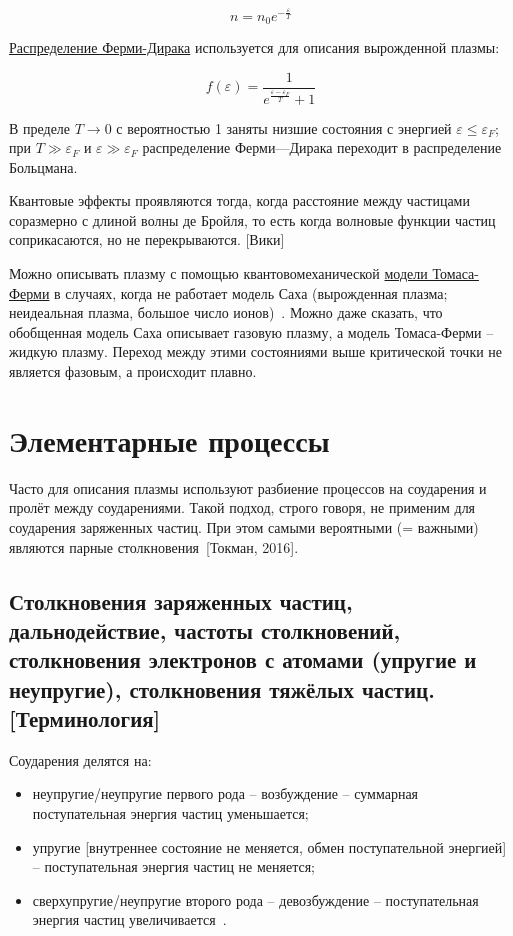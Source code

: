 \documentclass[10pt, a4paper]{article}
\newcommand{\Tokman}{~[Токман, 2016]}
\let\stdsection\section
\renewcommand\section{\newpage\stdsection}
\begin{document}
\begin{equation}
	n = n_0e^{-\frac{\varepsilon}{T}}
\end{equation}

\uline{Распределение Ферми-Дирака} используется для описания вырожденной плазмы:

\begin{equation}
	f(\varepsilon) = \frac{1}{e^{\frac{\varepsilon-\varepsilon_F}{T}}+1}
\end{equation}

В пределе $T\rightarrow 0$ с вероятностью 1 заняты низшие состояния с энергией $\varepsilon \leq \varepsilon_F$; при $T \gg \varepsilon_F$ и $\varepsilon \gg \varepsilon_F$ распределение Ферми—Дирака переходит в распределение Больцмана.

Квантовые эффекты проявляются тогда, когда расстояние между частицами соразмерно с длиной волны де Бройля, то есть когда волновые функции частиц соприкасаются, но не перекрываются. [Вики]

Можно описывать плазму с помощью квантовомеханической \uline{модели Томаса-Ферми} в случаях, когда не работает модель Саха (вырожденная плазма; неидеальная плазма, большое число ионов)~\cite{kalitkin}. Можно даже сказать, что обобщенная модель Саха описывает газовую плазму, а модель Томаса-Ферми -- жидкую плазму. Переход между этими состояниями выше критической точки не является фазовым, а происходит плавно. 

\section{Элементарные процессы}

Часто для описания плазмы используют разбиение процессов на соударения и пролёт между соударениями. Такой подход, строго говоря, не применим для соударения заряженных частиц. При этом самыми вероятными (= важными) являются парные столкновения\Tokman. 

\subsection{Столкновения заряженных частиц, дальнодействие, частоты столкновений, столкновения электронов с атомами (упругие и неупругие), столкновения тяжёлых частиц. [Терминология]}

Соударения делятся на:
\begin{itemize}
	\item неупругие/неупругие первого рода -- возбуждение -- суммарная поступательная энергия частиц уменьшается;
	\item упругие [внутреннее состояние не меняется, обмен поступательной энергией] -- поступательная энергия частиц не меняется;
	\item сверхупругие/неупругие второго рода -- девозбуждение -- поступательная энергия частиц увеличивается~\cite{raizer}.
\end{itemize}
\end{document}
